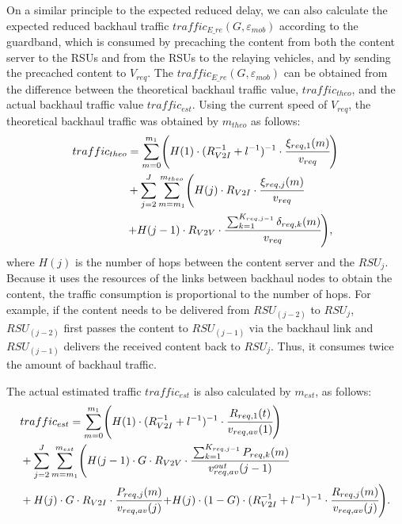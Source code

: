 \documentclass[electronics,aricle,accept,pdftex,moreauthors]{Definitions/mdpi}
\begin{document}
On a similar principle to the expected reduced delay, we can also calculate the expected reduced backhaul traffic $traffic_{E\_re}(G, \varepsilon_{mob})$ according to the guardband, which is consumed by precaching the content from both the content server to the RSUs and from the RSUs to the relaying vehicles, and by sending the precached content to ${V}_{req}$.
The $traffic_{E\_re}(G, \varepsilon_{mob})$ can be obtained from the difference between the theoretical backhaul traffic value, $traffic_{theo}$, and the actual backhaul traffic value ${traffic}_{est}$.
Using the current speed of $V_{req}$, the theoretical backhaul traffic was obtained by $m_{theo}$ as follows:
\begin{equation}
    \begin{split}
        traffic_{theo}&=\sum_{m=0}^{m_{1}}\left(H(1)\cdot (R_{V2I}^{-1} + l^{-1})^{-1} \cdot \cfrac{\xi_{req, 1}(m)}{v_{req}}\right)\\
        &+\sum_{j=2}^{J}\sum_{m=m_{1}}^{m_{theo}}\left(H(j)\cdot R_ {V2I}\cdot\cfrac{\xi_{req, j}(m)}{v_{req}}\right.\\
        &\left.+H(j-1)\cdot R_{V2V}\cdot\cfrac{\sum_{k=1}^{K_{req,j-1}}\delta_{req, k}(m)}{v_{req}}\right) ,
    \end{split}
\end{equation}
where $H(j)$ is the number of hops between the content server and the ${RSU}_{j}$. Because it uses the resources of the links between backhaul nodes to obtain the content, the traffic consumption is proportional to the number of hops. 
For example, if the content needs to be delivered from ${RSU}_{(j-2)}$ to ${RSU}_{j}$, ${RSU}_{(j-2)}$ first passes the content to ${RSU}_{(j-1)}$ via the backhaul link and ${RSU}_{(j-1)}$ delivers the received content back to ${RSU}_{j}$. Thus, it consumes twice the amount of backhaul traffic.

The actual estimated traffic $traffic_{est}$ is also calculated by $m_{est}$, as follows:
\begin{equation}
    \begin{split}
        &traffic_{est}=\sum_{m=0}^{m_{1}}\left( H(1) \cdot  (R_{V2I}^{-1} + l^{-1})^{-1}  \cdot \cfrac{R_{req, 1}(t)}{v_{req, av}(1)}\right) \\
        &+\sum_{j=2}^{J}\sum_{m=m_{1}}^{m_{est}}\left( H(j-1)\cdot G\cdot R_{V2V} \cdot \cfrac{\sum_{k=1}^{K_{req,j-1}}P_{req, k}(m)}{v_{req, av}^{out}(j-1)}\right.\\
        &+H(j)\cdot G\cdot R_{V2I}\cdot\cfrac{P_{req, j}(m)}{v_{req, av}(j)}\left.+H(j)\cdot(1-G)\cdot (R_{V2I}^{-1} + l^{-1})^{-1} \cdot\cfrac{R_{req, j}(m)}{v_{req, av}(j)} \right).
    \end{split}
\end{equation}
\end{document}
